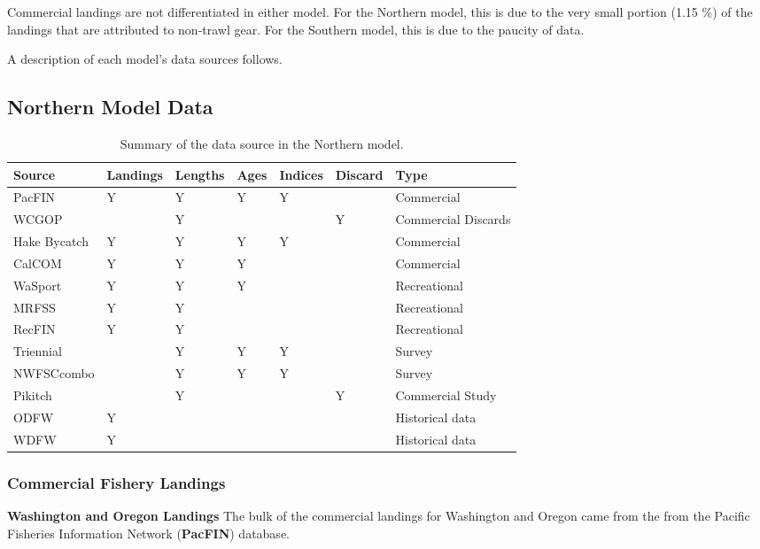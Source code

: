 \documentclass[12pt,]{article}
\begin{document}
Commercial landings are not differentiated in either model. For the
Northern model, this is due to the very small portion (1.15 \%) of the
landings that are attributed to non-trawl gear. For the Southern model,
this is due to the paucity of data.

A description of each model's data sources follows.

\subsection{Northern Model Data}\label{northern-model-data}

\begin{table}[ht]
\centering
\caption{Summary of the data source in the Northern model.} 
\label{tab:Data_sources}
\begin{tabular}{lllllll}
  \hline
Source & Landings & Lengths & Ages & Indices & Discard & Type \\ 
  \hline
PacFIN & Y & Y & Y & Y &  & Commercial \\ 
  WCGOP &  & Y &  &  & Y & Commercial Discards \\ 
  Hake Bycatch & Y & Y & Y & Y &  & Commercial \\ 
  CalCOM & Y & Y & Y &  &  & Commercial \\ 
  WaSport & Y & Y & Y &  &  & Recreational \\ 
  MRFSS & Y & Y &  &  &  & Recreational \\ 
  RecFIN & Y & Y &  &  &  & Recreational \\ 
  Triennial &  & Y & Y & Y &  & Survey \\ 
  NWFSCcombo &  & Y & Y & Y &  & Survey \\ 
  Pikitch &  & Y &  &  & Y & Commercial Study \\ 
  ODFW & Y &  &  &  &  & Historical data \\ 
  WDFW & Y &  &  &  &  & Historical data \\ 
   \hline
\end{tabular}
\end{table}

\subsubsection{Commercial Fishery
Landings}\label{commercial-fishery-landings}

\textbf{Washington and Oregon Landings} The bulk of the commercial
landings for Washington and Oregon came from the from the Pacific
Fisheries Information Network (\textbf{PacFIN}) database.
\end{document}
